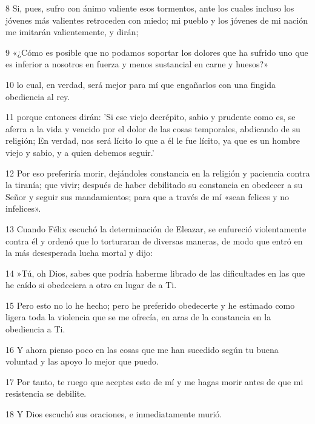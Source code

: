 \par 8 Si, pues, sufro con ánimo valiente esos tormentos, ante los cuales incluso los jóvenes más valientes retroceden con miedo; mi pueblo y los jóvenes de mi nación me imitarán valientemente, y dirán;

\par 9 «¿Cómo es posible que no podamos soportar los dolores que ha sufrido uno que es inferior a nosotros en fuerza y ​​menos sustancial en carne y huesos?»

\par 10 lo cual, en verdad, será mejor para mí que engañarlos con una fingida obediencia al rey.

\par 11 porque entonces dirán: 'Si ese viejo decrépito, sabio y prudente como es, se aferra a la vida y vencido por el dolor de las cosas temporales, abdicando de su religión; En verdad, nos será lícito lo que a él le fue lícito, ya que es un hombre viejo y sabio, y a quien debemos seguir.'

\par 12 Por eso preferiría morir, dejándoles constancia en la religión y paciencia contra la tiranía; que vivir; después de haber debilitado su constancia en obedecer a su Señor y seguir sus mandamientos; para que a través de mí «sean felices y no infelices».

\par 13 Cuando Félix escuchó la determinación de Eleazar, se enfureció violentamente contra él y ordenó que lo torturaran de diversas maneras, de modo que entró en la más desesperada lucha mortal y dijo:

\par 14 »Tú, oh Dios, sabes que podría haberme librado de las dificultades en las que he caído si obedeciera a otro en lugar de a Ti.

\par 15 Pero esto no lo he hecho; pero he preferido obedecerte y he estimado como ligera toda la violencia que se me ofrecía, en aras de la constancia en la obediencia a Ti.

\par 16 Y ahora pienso poco en las cosas que me han sucedido según tu buena voluntad y las apoyo lo mejor que puedo.

\par 17 Por tanto, te ruego que aceptes esto de mí y me hagas morir antes de que mi resistencia se debilite.

\par 18 Y Dios escuchó sus oraciones, e inmediatamente murió.

